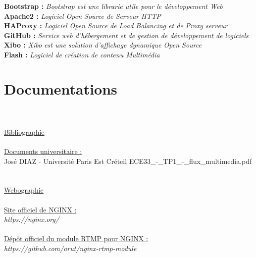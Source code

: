 \documentclass{report}
\begin{document}
\begin{tabbing}
\textbf{Bootstrap :}\> \textit{ Bootstrap est une librarie utile pour le développement Web}\\

\textbf{Apache2 :}\> \textit{ Logiciel  Open Source de Serveur HTTP  }\\

\textbf{HAProxy :} \>\textit{  Logiciel Open Source de Load Balancing et de Proxy serveur}\\

\textbf{GitHub : } \>\textit{ Service web d'hébergement et de gestion de développement de logiciels}\\

\textbf{Xibo :}\> \textit{ Xibo est une solution d'affichage dynamique  Open Source}\\

\textbf{Flash :} \>\textit{  Logiciel de création de contenu Multimédia}\\


\chapter{Documentations}
    \\
    \\
    
    \underline{\LARGE{Bibliographie}}
    \\
    \\
    
    \underline{Documents universitaire :}
    \\
    
    José DIAZ - Université Paris Est Créteil
    ECE33\_-\_TP1\_-\_flux\_multimedia.pdf\\


    \\
    \\

    
    \underline{\LARGE{Webographie}}
    \\
    \\
    
    \underline{Site officiel de NGINX :}\\
    \textit{https://nginx.org/}\\
    
    \\
    
    \underline{Dépôt officiel du module RTMP pour NGINX :}\\
    \textit{https://github.com/arut/nginx-rtmp-module}\\
    

\end{tabbing}
\end{document}
